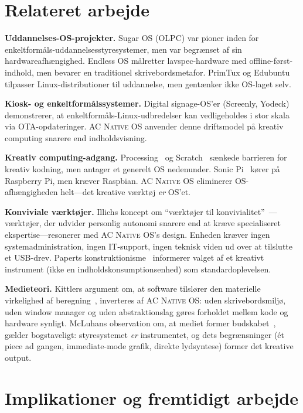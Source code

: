\documentclass[10pt,letterpaper,twocolumn]{article}
\newcommand{\acos}{\textsc{AC Native OS}}
\begin{document}
\section{Relateret arbejde}
\label{sec:related}

\textbf{Uddannelses-OS-projekter.} Sugar OS (OLPC) var pioner inden for enkeltformåls-uddannelsesstyresystemer, men var begrænset af sin hardwareafhængighed. Endless OS målretter lavspec-hardware med offline-først-indhold, men bevarer en traditionel skrivebordsmetafor. PrimTux og Edubuntu tilpasser Linux-distributioner til uddannelse, men gentænker ikke OS-laget selv.

\textbf{Kiosk- og enkeltformålssystemer.} Digital signage-OS'er (Screenly, Yodeck) demonstrerer, at enkeltformåls-Linux-udbredelser kan vedligeholdes i stor skala via OTA-opdateringer. \acos{} anvender denne driftsmodel på kreativ computing snarere end indholdsvisning.

\textbf{Kreativ computing-adgang.} Processing~\citep{reas2007processing} og Scratch~\citep{resnick2009scratch} sænkede barrieren for kreativ kodning, men antager et generelt OS nedenunder. Sonic Pi~\citep{aaron2016sonic} kører på Raspberry Pi, men kræver Raspbian. \acos{} eliminerer OS-afhængigheden helt---det kreative værktøj \emph{er} OS'et.

\textbf{Konviviale værktøjer.} Illichs koncept om ``værktøjer til konvivialitet''~\citep{illich1973tools}---værktøjer, der udvider personlig autonomi snarere end at kræve specialiseret ekspertise---resonerer med \acos{}'s design. Enheden kræver ingen systemadministration, ingen IT-support, ingen teknisk viden ud over at tilslutte et USB-drev. Paperts konstruktionisme~\citep{papert1980mindstorms} informerer valget af et kreativt instrument (ikke en indholdskonsumptionsenhed) som standardoplevelsen.

\textbf{Medieteori.} Kittlers argument om, at software tilslører den materielle virkelighed af beregning~\citep{kittler1995no}, inverteres af \acos{}: uden skrivebordsmiljø, uden window manager og uden abstraktionslag gøres forholdet mellem kode og hardware synligt. McLuhans observation om, at mediet former budskabet~\citep{mcluhan1964understanding}, gælder bogstaveligt: styresystemet \emph{er} instrumentet, og dets begrænsninger (ét piece ad gangen, immediate-mode grafik, direkte lydsyntese) former det kreative output.

\section{Implikationer og fremtidigt arbejde}
\label{sec:implications}
\end{document}
